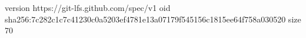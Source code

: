 version https://git-lfs.github.com/spec/v1
oid sha256:7c282c1c7c41230c0a5203ef4781e13a07179f545156c1815ee64f758a030520
size 70
